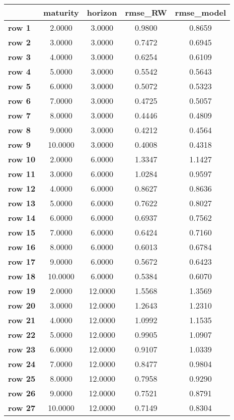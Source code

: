 \begin{tiny}\begin{tabular}{|l|c|c|c|c|}
\hline
&\textbf{maturity}&\textbf{horizon}&\textbf{rmse_RW}&\textbf{rmse_model}\\\hline
\textbf{row 1}&2.0000&3.0000&0.9800&0.8659\\\hline
\textbf{row 2}&3.0000&3.0000&0.7472&0.6945\\\hline
\textbf{row 3}&4.0000&3.0000&0.6254&0.6109\\\hline
\textbf{row 4}&5.0000&3.0000&0.5542&0.5643\\\hline
\textbf{row 5}&6.0000&3.0000&0.5072&0.5323\\\hline
\textbf{row 6}&7.0000&3.0000&0.4725&0.5057\\\hline
\textbf{row 7}&8.0000&3.0000&0.4446&0.4809\\\hline
\textbf{row 8}&9.0000&3.0000&0.4212&0.4564\\\hline
\textbf{row 9}&10.0000&3.0000&0.4008&0.4318\\\hline
\textbf{row 10}&2.0000&6.0000&1.3347&1.1427\\\hline
\textbf{row 11}&3.0000&6.0000&1.0284&0.9597\\\hline
\textbf{row 12}&4.0000&6.0000&0.8627&0.8636\\\hline
\textbf{row 13}&5.0000&6.0000&0.7622&0.8027\\\hline
\textbf{row 14}&6.0000&6.0000&0.6937&0.7562\\\hline
\textbf{row 15}&7.0000&6.0000&0.6424&0.7160\\\hline
\textbf{row 16}&8.0000&6.0000&0.6013&0.6784\\\hline
\textbf{row 17}&9.0000&6.0000&0.5672&0.6423\\\hline
\textbf{row 18}&10.0000&6.0000&0.5384&0.6070\\\hline
\textbf{row 19}&2.0000&12.0000&1.5568&1.3569\\\hline
\textbf{row 20}&3.0000&12.0000&1.2643&1.2310\\\hline
\textbf{row 21}&4.0000&12.0000&1.0992&1.1535\\\hline
\textbf{row 22}&5.0000&12.0000&0.9905&1.0907\\\hline
\textbf{row 23}&6.0000&12.0000&0.9107&1.0339\\\hline
\textbf{row 24}&7.0000&12.0000&0.8477&0.9804\\\hline
\textbf{row 25}&8.0000&12.0000&0.7958&0.9290\\\hline
\textbf{row 26}&9.0000&12.0000&0.7521&0.8791\\\hline
\textbf{row 27}&10.0000&12.0000&0.7149&0.8304\\\hline
\end{tabular}
\end{tiny}